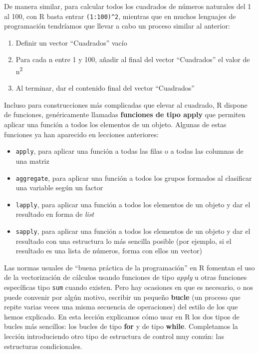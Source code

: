 \documentclass[
]{book}
\providecommand{\tightlist}{%
  \setlength{\itemsep}{0pt}\setlength{\parskip}{0pt}}
\theoremstyle{definition}
\theoremstyle{definition}
\theoremstyle{definition}
\theoremstyle{remark}
\begin{document}
De manera similar, para calcular todos los cuadrados de números naturales del 1 al 100, con R basta entrar \texttt{(1:100)\^{}2}, mientras que en muchos lenguajes de programación tendríamos que llevar a cabo un proceso similar al anterior:

\begin{enumerate}
\def\labelenumi{\arabic{enumi}.}
\tightlist
\item
  Definir un vector ``Cuadrados'' vacío
\item
  Para cada n entre 1 y 100, añadir al final del vector ``Cuadrados'' el valor de n\textsuperscript{2}
\item
  Al terminar, dar el contenido final del vector ``Cuadrados''
\end{enumerate}

Incluso para construcciones más complicadas que elevar al cuadrado, R dispone de funciones, genéricamente llamadas \textbf{funciones de tipo apply} que permiten aplicar una función a todos los elementos de un objeto. Algunas de estas funciones ya han aparecido en lecciones anteriores:

\begin{itemize}
\item
  \texttt{apply}, para aplicar una función a todas las filas o a todas las columnas de una matriz
\item
  \texttt{aggregate}, para aplicar una función a todos los grupos formados al clasificar una variable según un factor
\item
  \texttt{lapply}, para aplicar una función a todos los elementos de un objeto y dar el resultado en forma de \emph{list}
\item
  \texttt{sapply}, para aplicar una función a todos los elementos de un objeto y dar el resultado con una estructura lo más sencilla posible (por ejemplo, si el resultado es una lista de números, forma con ellos un vector)
\end{itemize}

Las normas usuales de ``buena práctica de la programación'' en R fomentan el uso de la vectorización de cálculos usando funciones de tipo \emph{apply} u otras funciones específicas tipo \texttt{sum} cuando existen. Pero hay ocasiones en que es necesario, o nos puede convenir por algún motivo, escribir un pequeño \textbf{bucle} (un proceso que repite varias veces una misma secuencia de operaciones) del estilo de los que hemos explicado. En esta lección explicamos cómo usar en R los dos tipos de bucles más sencillos: los bucles de tipo \textbf{for} y de tipo \textbf{while}. Completamos la lección introduciendo otro tipo de estructura de control muy común: las estructuras condicionales.
\end{document}
